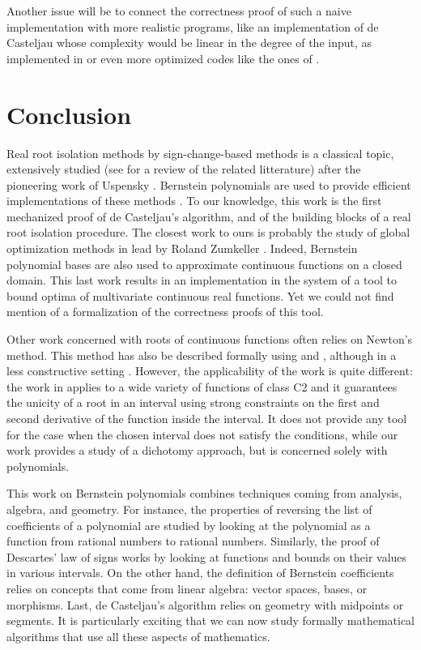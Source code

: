 \documentclass{mscs}
\begin{document}
Another issue will be to connect the correctness proof of such a
naive implementation with more realistic programs, like an
implementation of de Casteljau whose complexity would be
linear in the degree of the input, as
implemented in \cite{cadcoq} or even more optimized codes like the
ones of \cite{mourrainetal}.

\section{Conclusion}

Real root isolation methods by sign-change-based methods is a
classical topic, extensively studied (see \cite{rouillieretal} for a
review of the related litterature) after the pioneering work of
Uspensky \cite{uspensky}. Bernstein polynomials are used to provide
efficient implementations of these methods
\cite{mourrainetal, rouillieretal}.  To our knowledge, this work is
the first mechanized proof of de Casteljau's algorithm, and of the
building blocks of a real root isolation procedure. The closest work
to ours is probably the study of global optimization methods in \Coq{}
lead by Roland Zumkeller \cite{zumkellerphd}. Indeed, Bernstein
polynomial bases are also used to approximate continuous functions on a
closed domain. This last work results in an implementation in the
\Coq{} system of a tool to bound optima of multivariate continuous real
functions. Yet we could not find mention of a formalization of the
correctness proofs of this tool.

Other work concerned with roots of continuous functions often relies on
Newton's method.  This method has also be described formally using \Coq{}
and \ssr{}, although in a less constructive setting
\cite{Pasca}.  However, the applicability of the work is quite
different: the work in \cite{Pasca} applies to a wide variety of
functions of class C2 and it guarantees the unicity of a root in an
interval using strong constraints on the first and second derivative
of the function inside the interval.  It does not provide any tool for
the case when the chosen interval does not satisfy the conditions,
while our work provides a study of a dichotomy approach, but is
concerned solely with polynomials.

This work on Bernstein polynomials combines techniques coming from
analysis, algebra, and geometry. For instance, the properties of
reversing the list of coefficients of a polynomial are studied by
looking at the polynomial as a function from rational numbers to
rational numbers. Similarly, the proof of Descartes' law of signs
works by looking at functions and bounds on their values in various
intervals. On the other hand, the definition of Bernstein coefficients
relies on concepts that come from linear algebra: vector spaces,
bases, or morphisms. Last, de Casteljau's algorithm relies on geometry
with midpoints or segments. It is particularly exciting that we can
now study formally mathematical algorithms that use all these aspects
of mathematics.
\end{document}
